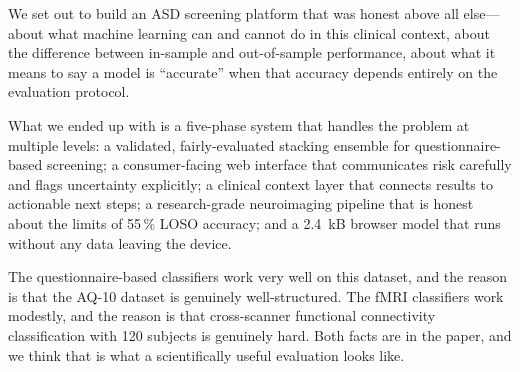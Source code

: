 \documentclass[conference]{IEEEtran}
\begin{document}
We set out to build an ASD screening platform that was honest above
all else---about what machine learning can and cannot do in this
clinical context, about the difference between in-sample and
out-of-sample performance, about what it means to say a model is
``accurate'' when that accuracy depends entirely on the evaluation
protocol.

What we ended up with is a five-phase system that handles the problem
at multiple levels: a validated, fairly-evaluated stacking ensemble
for questionnaire-based screening; a consumer-facing web interface that
communicates risk carefully and flags uncertainty explicitly; a clinical
context layer that connects results to actionable next steps; a
research-grade neuroimaging pipeline that is honest about the limits of
55\,\% LOSO accuracy; and a 2.4~kB browser model that runs without any
data leaving the device.

The questionnaire-based classifiers work very well on this dataset,
and the reason is that the AQ-10 dataset is genuinely well-structured.
The fMRI classifiers work modestly, and the reason is that cross-scanner
functional connectivity classification with 120 subjects is genuinely
hard. Both facts are in the paper, and we think that is what a
scientifically useful evaluation looks like.
\end{document}
